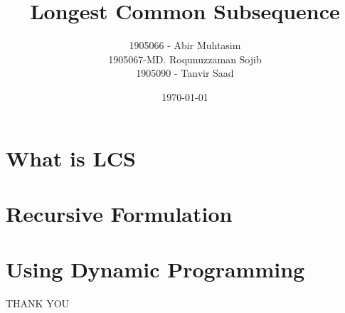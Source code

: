 \documentclass[10pt]{beamer}
\title{Longest Common Subsequence}
\author{1905066 - Abir Muhtasim\\1905067-MD. Roqunuzzaman Sojib\\1905090 - Tanvir Saad}
\institute{Bangladesh University of Enginnering and Technology}
\date{\today}
\begin{document}
\frame{\titlepage}

\begin{frame}
\tableofcontents
\end{frame}


\section{What is LCS}




 \section{Recursive Formulation}
 

\section{Using Dynamic Programming}







\begin{frame}[label=conclusion, standout]
    \begin{center}
    \Huge THANK YOU
    \end{center}
\end{frame}
\end{document}
